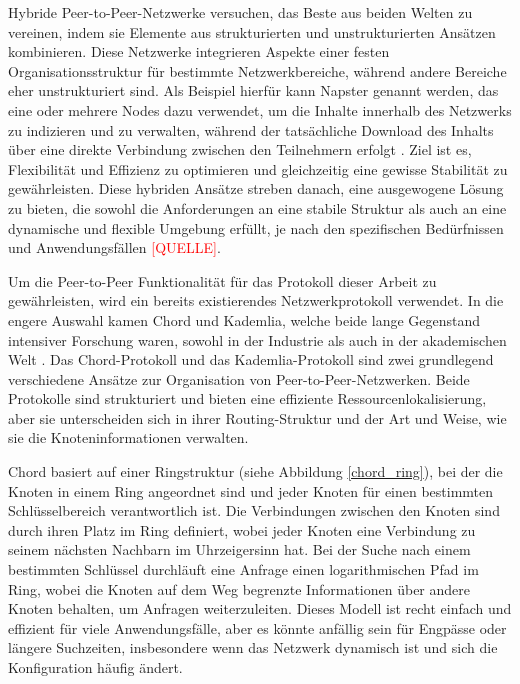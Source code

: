 Hybride Peer-to-Peer-Netzwerke versuchen, das Beste aus beiden Welten zu vereinen, indem sie Elemente aus strukturierten und unstrukturierten Ansätzen kombinieren. Diese Netzwerke integrieren Aspekte einer festen Organisationsstruktur für bestimmte Netzwerkbereiche, während andere Bereiche eher unstrukturiert sind. Als Beispiel hierfür kann Napster genannt werden, das eine oder mehrere Nodes dazu verwendet, um die Inhalte innerhalb des Netzwerks zu indizieren und zu verwalten, während der tatsächliche Download des Inhalts über eine direkte Verbindung zwischen den Teilnehmern erfolgt \parencite{Yang_ComparingHybridP2PSystems}.
Ziel ist es, Flexibilität und Effizienz zu optimieren und gleichzeitig eine gewisse Stabilität zu gewährleisten. Diese hybriden Ansätze streben danach, eine ausgewogene Lösung zu bieten, die sowohl die Anforderungen an eine stabile Struktur als auch an eine dynamische und flexible Umgebung erfüllt, je nach den spezifischen Bedürfnissen und Anwendungsfällen \textcolor{red}{[QUELLE]}.

Um die Peer-to-Peer Funktionalität für das Protokoll dieser Arbeit zu gewährleisten, wird ein bereits existierendes Netzwerkprotokoll verwendet. In die engere Auswahl kamen Chord und Kademlia, welche beide lange Gegenstand intensiver Forschung waren, sowohl in der Industrie als auch in der akademischen Welt \parencite[S. 808]{MedranoChavez_ChordKademliaHighChurnScenarios}. 
Das Chord-Protokoll und das Kademlia-Protokoll sind zwei grundlegend verschiedene Ansätze zur Organisation von Peer-to-Peer-Netzwerken. Beide Protokolle sind strukturiert und bieten eine effiziente Ressourcenlokalisierung, aber sie unterscheiden sich in ihrer Routing-Struktur und der Art und Weise, wie sie die Knoteninformationen verwalten.

Chord basiert auf einer Ringstruktur (siehe Abbildung \ref{chord_ring}), bei der die Knoten in einem Ring angeordnet sind und jeder Knoten für einen bestimmten Schlüsselbereich verantwortlich ist. Die Verbindungen zwischen den Knoten sind durch ihren Platz im Ring definiert, wobei jeder Knoten eine Verbindung zu seinem nächsten Nachbarn im Uhrzeigersinn hat. Bei der Suche nach einem bestimmten Schlüssel durchläuft eine Anfrage einen logarithmischen Pfad im Ring, wobei die Knoten auf dem Weg begrenzte Informationen über andere Knoten behalten, um Anfragen weiterzuleiten. Dieses Modell ist recht einfach und effizient für viele Anwendungsfälle, aber es könnte anfällig sein für Engpässe oder längere Suchzeiten, insbesondere wenn das Netzwerk dynamisch ist und sich die Konfiguration häufig ändert.

